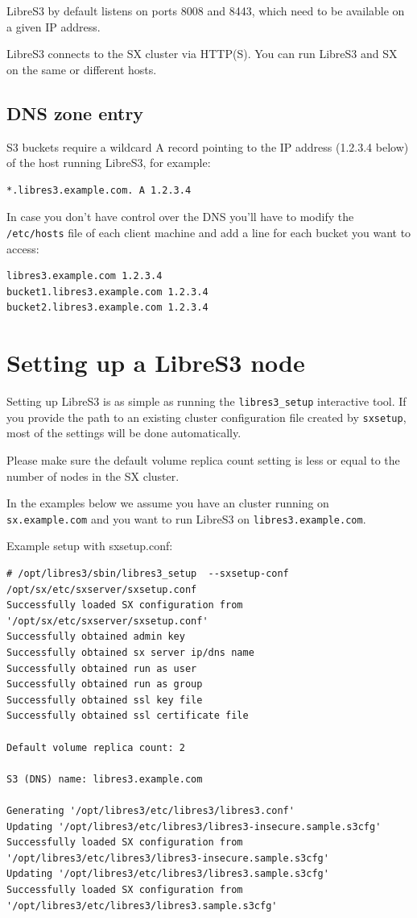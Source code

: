 LibreS3 by default listens on ports 8008 and 8443, which need to be available on a given
IP address.

LibreS3 connects to the SX cluster via HTTP(S). You can run LibreS3 and SX
on the same or different hosts.

\subsection*{DNS zone entry}

S3 buckets require a wildcard A record pointing to the IP address (1.2.3.4 below) of the
host running LibreS3, for example:
\small
\begin{lstlisting}
*.libres3.example.com. A 1.2.3.4
\end{lstlisting}
\LARGE

In case you don't have control over the DNS you'll have to modify the \verb|/etc/hosts| file
of each client machine and add a line for each bucket you want to access:
\small
\begin{lstlisting}
libres3.example.com 1.2.3.4
bucket1.libres3.example.com 1.2.3.4
bucket2.libres3.example.com 1.2.3.4
\end{lstlisting}
\LARGE

\section*{Setting up a LibreS3 node}

Setting up LibreS3 is as simple as running the \verb+libres3_setup+ interactive
tool. If you provide the path to an existing \SX cluster configuration file created
by \verb+sxsetup+, most of the settings will be done automatically.

Please make sure the default volume replica count setting is less or equal
to the number of nodes in the SX cluster.

In the examples below we assume you
have an \SX cluster running on \verb|sx.example.com| and you want to run
LibreS3 on \verb|libres3.example.com|.

Example setup with sxsetup.conf:
\small
\begin{lstlisting}
# /opt/libres3/sbin/libres3_setup  --sxsetup-conf /opt/sx/etc/sxserver/sxsetup.conf
Successfully loaded SX configuration from '/opt/sx/etc/sxserver/sxsetup.conf'
Successfully obtained admin key
Successfully obtained sx server ip/dns name
Successfully obtained run as user
Successfully obtained run as group
Successfully obtained ssl key file
Successfully obtained ssl certificate file

Default volume replica count: 2

S3 (DNS) name: libres3.example.com

Generating '/opt/libres3/etc/libres3/libres3.conf'
Updating '/opt/libres3/etc/libres3/libres3-insecure.sample.s3cfg'
Successfully loaded SX configuration from '/opt/libres3/etc/libres3/libres3-insecure.sample.s3cfg'
Updating '/opt/libres3/etc/libres3/libres3.sample.s3cfg'
Successfully loaded SX configuration from '/opt/libres3/etc/libres3/libres3.sample.s3cfg'
\end{lstlisting}
\LARGE

